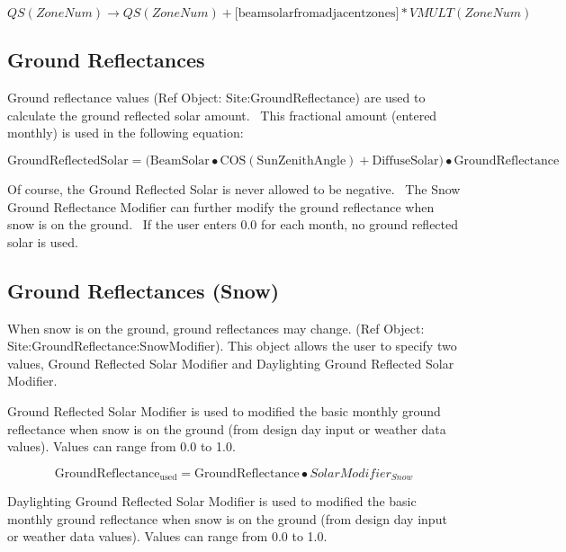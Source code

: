 \begin{equation}
QS(ZoneNum) \to QS(ZoneNum) + [{\mathrm{beam solar from adjacent zones]}}*VMULT(ZoneNum)
\end{equation}

\subsection{Ground Reflectances}\label{ground-reflectances}

Ground reflectance values (Ref Object: Site:GroundReflectance) are used to calculate the ground reflected solar amount.~ This fractional amount (entered monthly) is used in the following equation:

\begin{equation}
{\mathrm{GroundReflectedSolar = (BeamSolar}} \bullet {\mathrm{COS(SunZenithAngle) + DiffuseSolar)}} \bullet {\mathrm{GroundReflectance}}
\end{equation}

Of course, the Ground Reflected Solar is never allowed to be negative.~ The Snow Ground Reflectance Modifier can further modify the ground reflectance when snow is on the ground.~ If the user enters 0.0 for each month, no ground reflected solar is used.

\subsection{Ground Reflectances (Snow)}\label{ground-reflectances-snow}

When snow is on the ground, ground reflectances may change. (Ref Object: Site:\-Ground\-Re\-flect\-ance:\-Snow\-Modifier). This object allows the user to specify two values, Ground Reflected Solar Modifier and Daylighting Ground Reflected Solar Modifier.

Ground Reflected Solar Modifier is used to modified the basic monthly ground reflectance when snow is on the ground (from design day input or weather data values). Values can range from 0.0 to 1.0.

\begin{equation}
{\mathrm{GroundReflectanc}}{{\mathrm{e}}_{{\mathrm{used}}}} = {\mathrm{GroundReflectance}} \bullet SolarModifie{r_{Snow}}
\end{equation}

Daylighting Ground Reflected Solar Modifier is used to modified the basic monthly ground reflectance when snow is on the ground (from design day input or weather data values). Values can range from 0.0 to 1.0.

